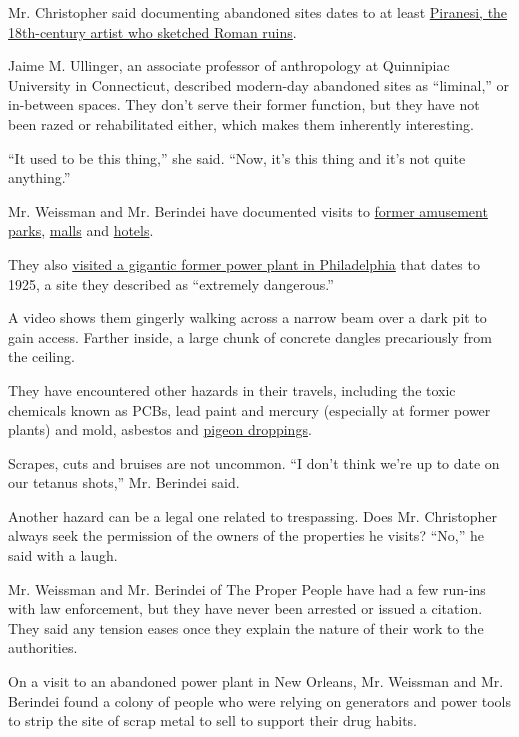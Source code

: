 Mr. Christopher said documenting abandoned sites dates to at least
\href{https://www.nytimes3xbfgragh.onion/2007/09/28/arts/design/28pira.html}{Piranesi,
the 18th-century artist who sketched Roman ruins}.

Jaime M. Ullinger, an associate professor of anthropology at Quinnipiac
University in Connecticut, described modern-day abandoned sites as
``liminal,'' or in-between spaces. They don't serve their former
function, but they have not been razed or rehabilitated either, which
makes them inherently interesting.

``It used to be this thing,'' she said. ``Now, it's this thing and it's
not quite anything.''

Mr. Weissman and Mr. Berindei have documented visits to
\href{https://www.youtube.com/watch?v=XTPOkrJLWPM}{former amusement
parks}, \href{https://www.youtube.com/watch?v=QmNyVFibClQ}{malls} and
\href{https://www.youtube.com/watch?v=OUQz62-Ny1g}{hotels}.

They also \href{https://www.youtube.com/watch?v=oz5BamDwRDg}{visited a
gigantic former power plant in Philadelphia} that dates to 1925, a site
they described as ``extremely dangerous.''

A video shows them gingerly walking across a narrow beam over a dark pit
to gain access. Farther inside, a large chunk of concrete dangles
precariously from the ceiling.

They have encountered other hazards in their travels, including the
toxic chemicals known as PCBs, lead paint and mercury (especially at
former power plants) and mold, asbestos and
\href{https://www1.nyc.gov/site/doh/health/health-topics/pigeon.page}{pigeon
droppings}.

Scrapes, cuts and bruises are not uncommon. ``I don't think we're up to
date on our tetanus shots,'' Mr. Berindei said.

Another hazard can be a legal one related to trespassing. Does Mr.
Christopher always seek the permission of the owners of the properties
he visits? ``No,'' he said with a laugh.

Mr. Weissman and Mr. Berindei of The Proper People have had a few
run-ins with law enforcement, but they have never been arrested or
issued a citation. They said any tension eases once they explain the
nature of their work to the authorities.

On a visit to an abandoned power plant in New Orleans, Mr. Weissman and
Mr. Berindei found a colony of people who were relying on generators and
power tools to strip the site of scrap metal to sell to support their
drug habits.

